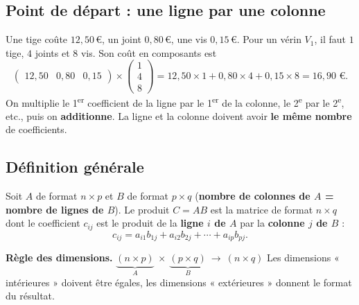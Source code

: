 \documentclass[a4paper,11pt]{article}
\newcommand{\M}[1]{\begin{pmatrix}#1\end{pmatrix}}
\begin{document}
\subsection{Point de départ : une ligne par une colonne}\label{subsec:lignecolonne}

\begin{exemple}\label{ex:lignecolonne}
Une tige coûte $12{,}50$\,€, un joint $0{,}80$\,€, une vis $0{,}15$\,€. Pour un vérin $V_1$, il faut $1$ tige, $4$ joints et $8$ vis. Son coût en composants est
\[
\M{12{,}50 & 0{,}80 & 0{,}15}\times\M{1\\4\\8} = 12{,}50\times 1 + 0{,}80\times 4 + 0{,}15\times 8 = 16{,}90 \text{ €.}
\]
On multiplie le 1\textsuperscript{er} coefficient de la ligne par le 1\textsuperscript{er} de la colonne, le 2\textsuperscript{e} par le 2\textsuperscript{e}, etc., puis on \textbf{additionne}. La ligne et la colonne doivent avoir \textbf{le même nombre} de coefficients.
\end{exemple}

\subsection{Définition générale}\label{subsec:defproduit}

\begin{definition}
Soit $A$ de format $n\times p$ et $B$ de format $p\times q$ (\textbf{nombre de colonnes de $A$ = nombre de lignes de $B$}). Le produit $C = AB$ est la matrice de format $n\times q$ dont le coefficient $c_{ij}$ est le produit de la \textbf{ligne $i$ de $A$} par la \textbf{colonne $j$ de $B$} :
\[
c_{ij} = a_{i1}b_{1j} + a_{i2}b_{2j} + \cdots + a_{ip}b_{pj}.
\]
\end{definition}

\begin{tcolorbox}[colback=white, colframe=uimmblue, boxrule=0.8pt, arc=3pt]
\textbf{Règle des dimensions.} \quad
$\underbrace{(n\times \boxed{p})}_{A}\ \times\ \underbrace{(\boxed{p}\times q)}_{B} \ \longrightarrow\ (n\times q)$
\quad Les dimensions « intérieures » doivent être égales, les dimensions « extérieures » donnent le format du résultat.
\end{tcolorbox}
\end{document}
